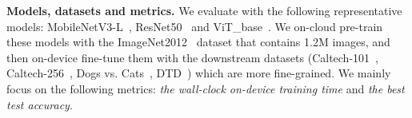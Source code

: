 \noindent \textbf{Models, datasets and metrics.}
We evaluate \sys with the following representative models: MobileNetV3-L~\cite{howard2019searching}, ResNet50~\cite{he2015deep} and ViT\_base~\cite{dosovitskiy2021an}.
We on-cloud pre-train these models with the ImageNet2012~\cite{ImageNet2012} dataset that contains 1.2M images, and then on-device fine-tune them with the downstream datasets (Caltech-101~\cite{c101}, Caltech-256~\cite{c256}, Dogs vs. Cats~\cite{Dvg}, DTD~\cite{dtd}) which are more fine-grained.
We mainly focus on the following metrics: \textit{the wall-clock on-device training time} and \textit{the best test accuracy}.




